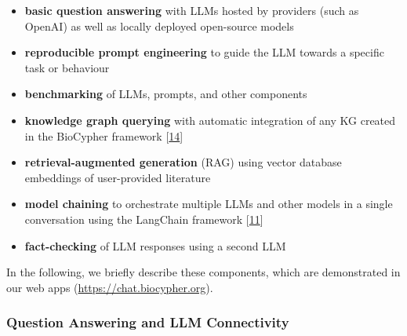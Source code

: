 \begin{itemize}
\item
  \textbf{basic question answering} with LLMs hosted by providers (such as OpenAI) as well as locally deployed open-source models
\item
  \textbf{reproducible prompt engineering} to guide the LLM towards a specific task or behaviour
\item
  \textbf{benchmarking} of LLMs, prompts, and other components
\item
  \textbf{knowledge graph querying} with automatic integration of any KG created in the BioCypher framework {[}\protect\hyperlink{ref-tr1XjZ1R}{14}{]}
\item
  \textbf{retrieval-augmented generation} (RAG) using vector database embeddings of user-provided literature
\item
  \textbf{model chaining} to orchestrate multiple LLMs and other models in a single conversation using the LangChain framework {[}\protect\hyperlink{ref-UEmjXz02}{11}{]}
\item
  \textbf{fact-checking} of LLM responses using a second LLM
\end{itemize}

In the following, we briefly describe these components, which are demonstrated in our web apps (\url{https://chat.biocypher.org}).

\hypertarget{question-answering-and-llm-connectivity}{%
\subsubsection{Question Answering and LLM Connectivity}\label{question-answering-and-llm-connectivity}}

